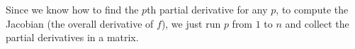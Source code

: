 \documentclass[letterpaper,11pt]{article}
\begin{document}
\begin{enumerate}
\begin{enumerate}
                Since we know how to find the $p$th partial derivative for any
                $p$, to compute the Jacobian (the overall derivative of $f$),
                we just run $p$ from $1$ to $n$ and collect the partial
                derivatives in a matrix.
        \end{enumerate}
\end{enumerate}
\end{document}
